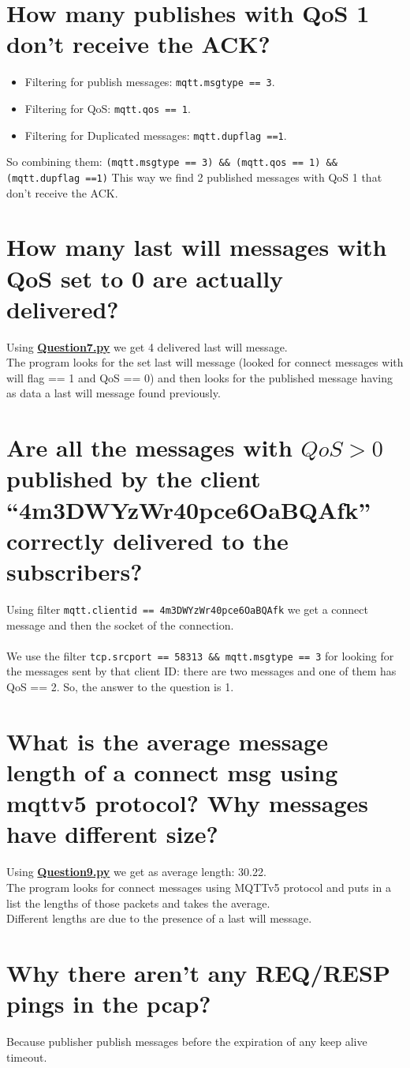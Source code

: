 \documentclass{article} %
\begin{document}
\section{\large{How many publishes with QoS 1 don’t receive the ACK?}}
    \begin{itemize}
        \item Filtering for publish messages: \texttt{mqtt.msgtype == 3}.
        \item Filtering for QoS: \texttt{mqtt.qos == 1}.
        \item Filtering for Duplicated messages: \texttt{mqtt.dupflag ==1}.
    \end{itemize}
    So combining them: \texttt{(mqtt.msgtype == 3) \&\& (mqtt.qos == 1) \&\& (mqtt.dupflag ==1)}
    This way we find 2 published messages with QoS 1 that don’t receive the ACK.


\section{\large{How many last will messages with QoS set to 0 are actually delivered?}} 
    Using \href{https://github.com/LucaFerraro/IoT-HomeChallenge/blob/master/3/Question7.py}{\textcolor{url_blue}{\textbf{Question7.py}}} we get 4 delivered last will message. \\
    The program looks for the set last will message (looked for connect messages with will flag == 1 and QoS == 0) and then looks for the published message having as data a last will message found previously.

   
\section{\large{Are all the messages with $QoS > 0$ published by the client “4m3DWYzWr40pce6OaBQAfk” correctly delivered to the subscribers?}}
    Using filter \texttt{mqtt.clientid == 4m3DWYzWr40pce6OaBQAfk} we get a connect message and then the socket of the connection. \\ \\
    We use the filter \texttt{tcp.srcport == 58313 \&\& mqtt.msgtype == 3} for looking for the messages sent by that client ID: 
    there are two messages and one of them has QoS == 2. So, the answer to the question is 1.


\section{\large{What is the average message length of a connect msg using mqttv5 protocol? Why messages have different size?}}
    Using \href{https://github.com/LucaFerraro/IoT-HomeChallenge/blob/master/3/Question9.py}{\textcolor{url_blue}{\textbf{Question9.py}}} we get as average length: 30.22. \\
    The program looks for connect messages using MQTTv5 protocol and puts in a list the lengths of those packets and takes the average. \\
    Different lengths are due to the presence of a last will message.


\section{\large{Why there aren’t any REQ/RESP pings in the pcap?}}
Because publisher publish messages before the expiration of any keep alive timeout.
\end{document}
